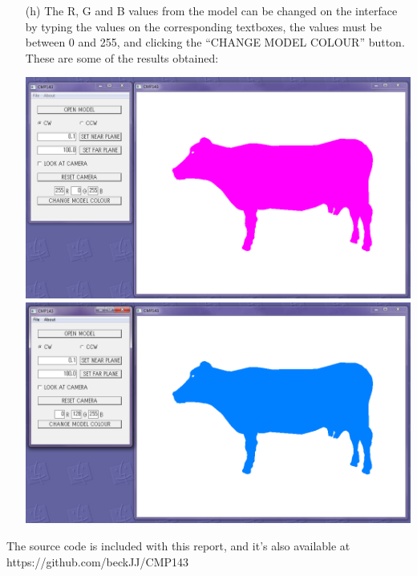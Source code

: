 \documentclass[12pt]{article}
\begin{document}
\begin{itemize}
\item[(h)] The R, G and B values from the model can be changed on the interface by typing the values on the corresponding textboxes, the values must be between 0 and 255, and clicking the ``CHANGE MODEL COLOUR'' button. These are some of the results obtained:
\begin{center}
	\includegraphics[scale=0.5]{13.png}
	\includegraphics[scale=0.5]{14.png}
\end{center}
\end{itemize}

The source code is included with this report, and it's also available at https://github.com/beckJJ/CMP143
\end{document}
